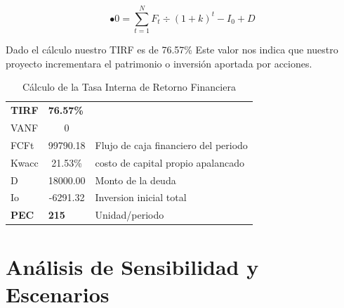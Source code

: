 \documentclass[a4paper,openright,12pt]{book}
\begin{document}
\begin{equation}
•0=\sum^{N}_{t=1}F_{t}\div(1+k)^{t} - I_{0}+D
\end{equation}
 
 Dado el cálculo nuestro TIRF es de 76.57\%   Este valor nos indica que nuestro proyecto incrementara el patrimonio o inversión aportada por acciones. 
 
\begin{table}[H]
\begin{tabular}{lclllll}
\textbf{TIRF} & \multicolumn{1}{l}{\textbf{76.57\%}} & \multicolumn{5}{l}{\textbf{}}                            \\
VANF          & 0                                    & \multicolumn{5}{c}{}                                     \\
FCFt          & 99790.18                             & \multicolumn{5}{l}{Flujo de caja financiero del periodo} \\
Kwacc         & 21.53\%                              & \multicolumn{5}{l}{costo de capital propio apalancado}   \\
D             & 18000.00                             & \multicolumn{5}{l}{Monto de la deuda}                    \\
Io            & -6291.32                             & \multicolumn{5}{l}{Inversion inicial total}              \\
\textbf{PEC}  & \multicolumn{1}{l}{\textbf{215}}     & \multicolumn{5}{l}{Unidad/periodo}                      
\end{tabular}
\caption{Cálculo de la Tasa Interna de Retorno Financiera}
\label{Tabla17}
\end{table}
 

\section{Análisis de Sensibilidad y Escenarios}
\end{document}

